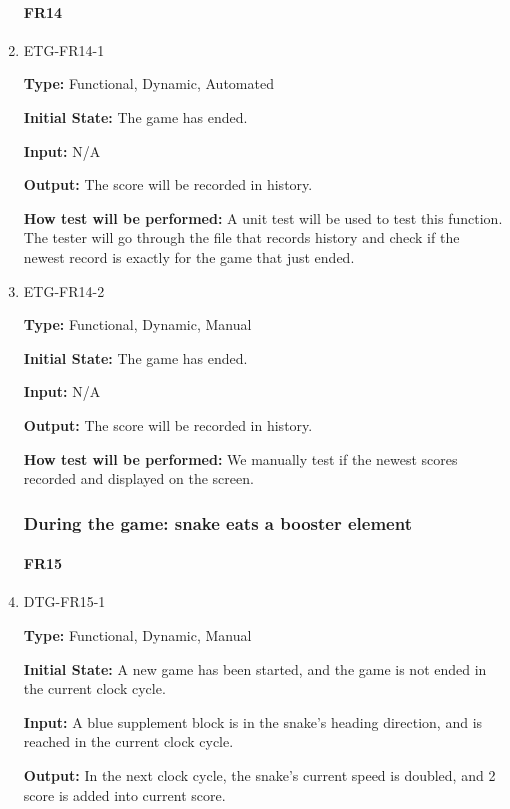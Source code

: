 \documentclass[12pt, titlepage]{article}
\begin{document}
\begin{enumerate}
\paragraph{FR14}
\item{ETG-FR14-1\\}

\textbf{Type:} Functional, Dynamic, Automated

\textbf{Initial State:} The game has ended.

\textbf{Input:} N/A
 
\textbf{Output:} The score will be recorded in history. 

\textbf{How test will be performed:} A unit test will be used to test this function. The tester will go through the file that records history and check if the newest record is exactly for the game that just ended. 

\item{ETG-FR14-2\\}

\textbf{Type:} Functional, Dynamic, Manual

\textbf{Initial State:} The game has ended.

\textbf{Input:} N/A
 
\textbf{Output:} The score will be recorded in history. 

\textbf{How test will be performed:} We manually test if the newest scores recorded and displayed on the screen.



\subsubsection{During the game: snake eats a booster element}

\paragraph{FR15}
\item{DTG-FR15-1\\}

\textbf{Type:} Functional, Dynamic, Manual

\textbf{Initial State:} A new game has been started, and the game is not ended in the current clock cycle.

\textbf{Input:} A blue supplement block is in the snake's heading direction, and is reached in the current clock cycle.

\textbf{Output:} In the next clock cycle, the snake's current speed is doubled, and 2 score is added into current score.


\end{enumerate}
\end{document}
